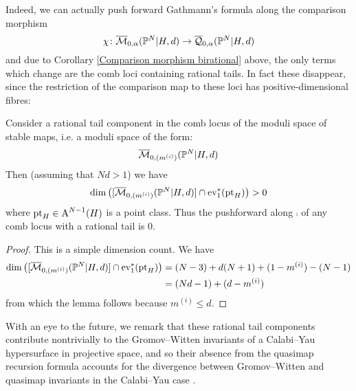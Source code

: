 Indeed, we can actually push forward Gathmann's formula along the comparison morphism
\begin{equation*} \chi \colon \overline{\mathcal M}_{0,\alpha}(\mathbb P^N|H,d)\rightarrow\overline{\mathcal Q}_{0,\alpha}(\mathbb P^N|H,d) \end{equation*}
and due to Corollary \ref{Comparison morphism birational} above, the only terms which change are the comb loci containing rational tails. In fact these disappear, since the restriction of the comparison map to these loci has positive-dimensional fibres:
\begin{lem}\label{lem:posdimfiber} Consider a rational tail component in the comb locus of the moduli space of stable maps, i.e. a moduli space of the form:
\begin{equation*} \overline{\mathcal M}_{0,(m^{(i)})}(\mathbb P^N|H,d) \end{equation*}
Then (assuming that $Nd > 1$) we have
\begin{equation*} \dim \left( [\overline{\mathcal M}_{0,(m^{(i)})}(\mathbb P^N|H,d)] \cap \operatorname{ev}_1^*(\operatorname{pt}_H) \right) > 0 \end{equation*}
where $\operatorname{pt}_H \in \operatorname{A}^{N-1}(H)$ is a point class. Thus the pushforward along $\comp$ of any comb locus with a rational tail is $0$.
\end{lem}
\begin{proof} This is a simple dimension count. We have
\begin{align*} \dim \left( [\overline{\mathcal M}_{0,(m^{(i)})}(\mathbb P^N|H,d)] \cap \operatorname{ev}_1^*(\operatorname{pt}_H) \right) & =(N-3)+d(N+1)+(1-m^{(i)})-(N-1) \\
& =(Nd-1)+(d-m^{(i)})
\end{align*}
from which the lemma follows because $m^{(i)} \leq d$.
\end{proof}
\begin{remark} With an eye to the future, we remark that these rational tail components contribute nontrivially to the Gromov--Witten invariants of a Calabi--Yau hypersurface in projective space, and so their absence from the quasimap recursion formula accounts for the divergence between Gromov--Witten and quasimap invariants in the Calabi--Yau case \cite[Rmk. 1.6]{Ga-MF}. \end{remark}

